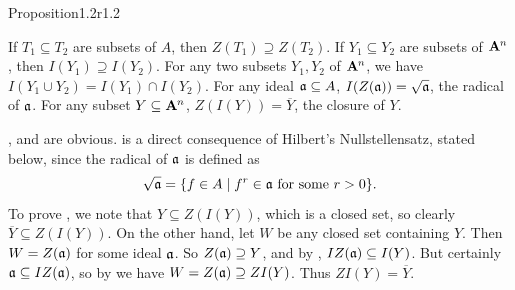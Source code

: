 {\begin{result}{Proposition}{1.2}{r1.2}
\begin{parts}
 If $T_1\subseteq T_2$ are subsets of $A$, then $Z(T_1)\supseteq Z(T_2)$.
 If $Y_1\subseteq Y_2$ are subsets of $\AffSpace{n}$, then $I(Y_1)\supseteq I(Y_2)$.
 For any two subsets $Y_1,Y_2$ of $\AffSpace{n}$, we have $I(Y_1\cup Y_2)=I(Y_1)\cap I(Y_2)$.
 For any ideal $\mathfrak a\subseteq A$, $I(Z(\mathfrak a))=\sqrt{\mathfrak a}$, the radical of $\mathfrak a$.
 For any subset $Y\subseteq\AffSpace{n}$, $Z(I(Y))=\overline Y$, the closure of $Y$.
\end{parts}
\end{result}
\Proof {},  and  are obvious.  is a direct consequence of Hilbert's Nullstellensatz, stated below, since the radical of $\mathfrak a$ is defined as
\[
\sqrt{\mathfrak a}=\{f\in A\mid f^r\in\mathfrak a\text{ for some }r>0\}.
\]
To prove , we note that $Y\subseteq Z(I(Y))$, which is a closed set, so clearly $\overline Y\subseteq Z(I(Y))$. On the other hand, let $W$ be any closed set containing $Y$. Then $W=Z(\mathfrak a)$ for some ideal $\mathfrak a$. So $Z(\mathfrak a)\supseteq Y$, and by , $IZ(\mathfrak a)\subseteq I(Y)$. But certainly $\mathfrak a\subseteq IZ(\mathfrak a)$, so by  we have $W=Z(\mathfrak a)\supseteq ZI(Y)$. Thus $ZI(Y)=\overline Y$.
}

